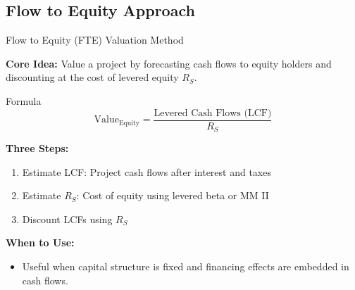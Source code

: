 \subsection{Flow to Equity Approach}
\begin{frame}{Flow to Equity (FTE) Valuation Method}
	
	\textbf{Core Idea:}  
	Value a project by forecasting cash flows to equity holders and discounting at the cost of levered equity \( R_S \).
	
	\vspace{0.3cm}
	\begin{block}{Formula}
		\[
		\text{Value}_{\text{Equity}} = \frac{\text{Levered Cash Flows (LCF)}}{R_S}
		\]
	\end{block}
	
	\vspace{0.2cm}
	\textbf{Three Steps:}
	\begin{enumerate}
		\item Estimate LCF: Project cash flows after interest and taxes
		\item Estimate \( R_S \): Cost of equity using levered beta or MM II
		\item Discount LCFs using \( R_S \)
	\end{enumerate}
	
	\vspace{0.2cm}
	\textbf{When to Use:}
	\begin{itemize}
		\item Useful when capital structure is fixed and financing effects are embedded in cash flows.
	\end{itemize}
	
\end{frame}

